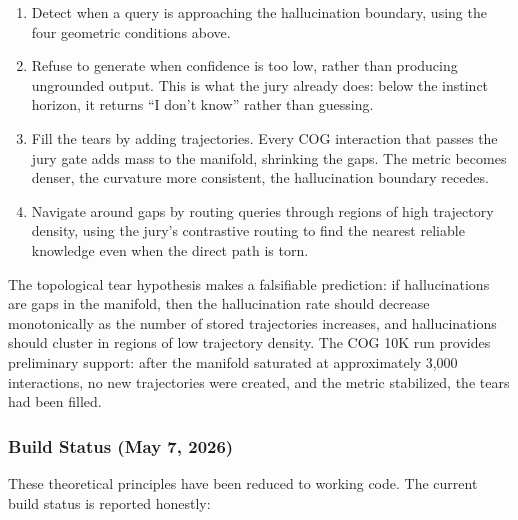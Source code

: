 \documentclass[11pt]{article}
\begin{document}
\begin{enumerate}[nosep]
\item Detect when a query is approaching the hallucination boundary,
      using the four geometric conditions above.
\item Refuse to generate when confidence is too low, rather than
      producing ungrounded output. This is what the jury already does: below
      the instinct horizon, it returns ``I don't know'' rather than guessing.
\item Fill the tears by adding trajectories. Every COG interaction
      that passes the jury gate adds mass to the manifold, shrinking the
      gaps. The metric becomes denser, the curvature more consistent, the
      hallucination boundary recedes.
\item Navigate around gaps by routing queries through regions of
      high trajectory density, using the jury's contrastive routing to find
      the nearest reliable knowledge even when the direct path is torn.
\end{enumerate}

The topological tear hypothesis makes a falsifiable prediction: if
hallucinations are gaps in the manifold, then the hallucination rate should
decrease monotonically as the number of stored trajectories increases, and
hallucinations should cluster in regions of low trajectory density. The COG
10K run provides preliminary support: after the manifold saturated at
approximately 3,000 interactions, no new trajectories were created, and the
metric stabilized, the tears had been filled.

\subsubsection{Build Status (May 7, 2026)}

These theoretical principles have been reduced to working code. The current
build status is reported honestly:
\end{document}
